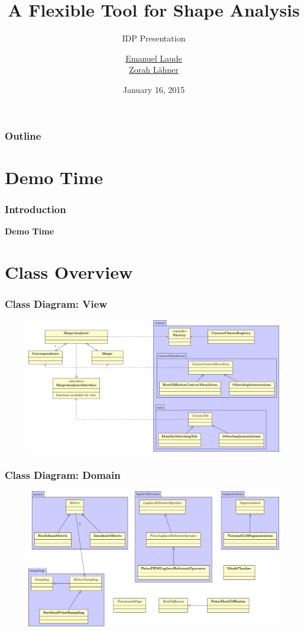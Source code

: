 \documentclass[compress]{beamer}
\title{A Flexible Tool for Shape Analysis}
\subtitle{IDP Presentation}
\author{\href{emanuel.laude@in.tum.de}{Emanuel Laude}\\ \href{laehner@in.tum.de}{Zorah L\"ahner} }
\date{January 16, 2015}
\institute{Technische Universit\"at M\"unchen}
\begin{document}
\begin{frame}
\titlepage
\end{frame}

\begin{frame}
\frametitle{Outline}
\tableofcontents
\end{frame}

\section{Demo Time}

\begin{frame}
	\frametitle{Introduction}
	
	\bf{Demo Time}
	
\end{frame}

\section{Class Overview}

\begin{frame}
  \frametitle{Class Diagram: View}
  \begin{figure}[h]
	\centering
	\includegraphics[width=\textwidth]{diagram.pdf}
\end{figure}
\end{frame}

\begin{frame}
  \frametitle{Class Diagram: Domain}
  \begin{figure}[h]
	\centering
	\includegraphics[width=\textwidth]{diagram2.pdf}
\end{figure}
\end{frame}
\end{document}

